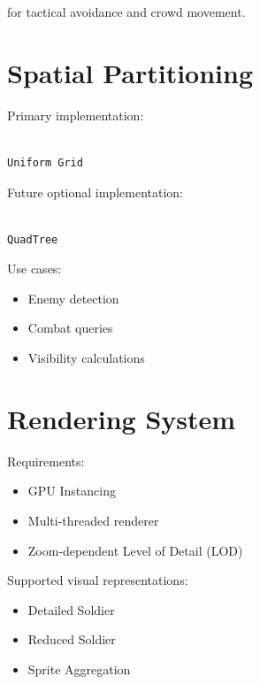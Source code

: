 \documentclass[11pt,a4paper]{article}
\begin{document}
for tactical avoidance and crowd movement.

\section{Spatial Partitioning}

Primary implementation:

\begin{verbatim}

Uniform Grid

\end{verbatim}

Future optional implementation:

\begin{verbatim}

QuadTree

\end{verbatim}

Use cases:

\begin{itemize}

    \item Enemy detection

    \item Combat queries

    \item Visibility calculations

\end{itemize}

\section{Rendering System}

Requirements:

\begin{itemize}

    \item GPU Instancing

    \item Multi-threaded renderer

    \item Zoom-dependent Level of Detail (LOD)

\end{itemize}

Supported visual representations:

\begin{itemize}

    \item Detailed Soldier

    \item Reduced Soldier

    \item Sprite Aggregation

\end{itemize}
\end{document}
